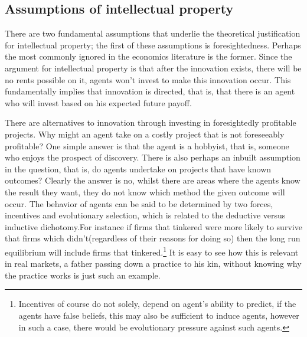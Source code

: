 \documentclass[12pt]{article}
\numberwithin{equation}{section}
\begin{document}


\subsection{Assumptions of intellectual property}


There are two fundamental assumptions that underlie the theoretical justification for intellectual property; the first of these assumptions is foresightedness. Perhaps the most commonly ignored in the economics literature is the former. Since the argument for intellectual property is that after the innovation exists, there will be no rents possible on it, agents won't invest to make this innovation occur. This fundamentally implies that innovation is directed, that is, that there is an agent who will invest based on his expected future payoff.

There are alternatives to innovation through investing in foresightedly profitable projects. Why might an agent take on a costly project that is not foreseeably profitable? One simple answer is that the agent is a hobbyist, that is, someone who enjoys the prospect of discovery. There is also perhaps an inbuilt assumption in the question, that is, do agents undertake on projects that have known outcomes? Clearly the answer is no, whilst there are areas where the agents know the result they want, they do not know which method the given outcome will occur. The behavior of agents can be said to be determined by two forces, incentives and evolutionary selection, which is related to the deductive versus inductive dichotomy.For instance if firms that tinkered were more likely to survive that firms which didn't(regardless of their reasons for doing so) then the long run equilibrium will include firms that tinkered.\footnote{Incentives of course do not solely, depend on agent’s  ability to predict, if the agents have false beliefs, this may also be sufficient to induce agents, however in such a case, there would be evolutionary pressure against such agents.} It is easy to see how this is relevant in real markets, a father passing down a practice to his kin, without knowing why the practice works is just such an example. 
\end{document}
